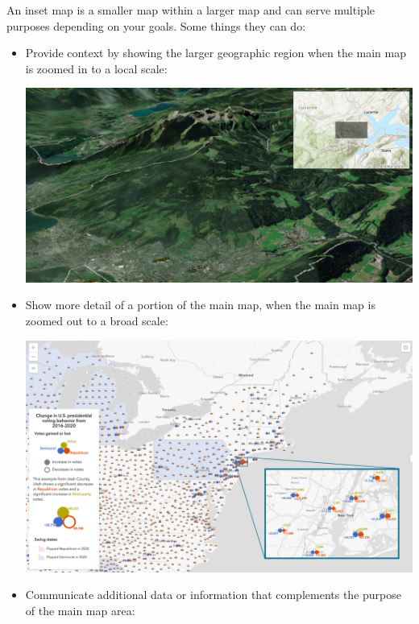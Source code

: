 \documentclass[oneside,a4paper,11pt,explicit]{book}
\begin{document}
\begin{tcolorbox}[enhanced jigsaw,breakable,pad at break*=1mm,
  colback=yellow!5!white,colframe=IceCreamLeaf,title=Inset Maps]
  An inset map is a smaller map within a larger map and can serve multiple purposes depending on your goals. Some things they can do:
    \begin{itemize}
         \item Provide context by showing the larger geographic region when the main map is zoomed in to a local scale:

         \vspace{.25em}
         
         \centerline{\includegraphics[width=.85\textwidth]{inset-overview.png}}

         \item Show more detail of a portion of the main map, when the main map is zoomed out to a broad scale:

         \vspace{.25em}
         
         \centerline{\includegraphics[width=.85\textwidth]{inset-detail.png}}

         \item Communicate additional data or information that complements the purpose of the main map area:


\end{itemize}
\end{tcolorbox}
\end{document}
